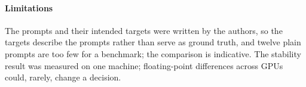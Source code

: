 \paragraph{Limitations}
The prompts and their intended targets were written by the authors, so the
targets describe the prompts rather than serve as ground truth, and twelve
plain prompts are too few for a benchmark; the comparison is indicative. The
stability result was measured on one machine; floating-point differences
across GPUs could, rarely, change a decision.

